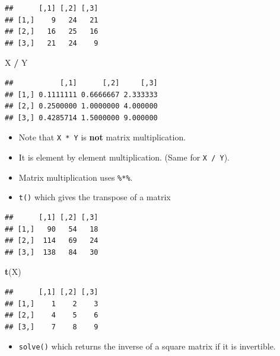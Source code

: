 \documentclass[]{book}
\newenvironment{Shaded}{\begin{snugshade}}{\end{snugshade}}
\newcommand{\KeywordTok}[1]{\textcolor[rgb]{0.13,0.29,0.53}{\textbf{#1}}}
\newcommand{\StringTok}[1]{\textcolor[rgb]{0.31,0.60,0.02}{#1}}
\newcommand{\OperatorTok}[1]{\textcolor[rgb]{0.81,0.36,0.00}{\textbf{#1}}}
\newcommand{\NormalTok}[1]{#1}
\providecommand{\tightlist}{%
  \setlength{\itemsep}{0pt}\setlength{\parskip}{0pt}}
\begin{document}
\begin{verbatim}
##      [,1] [,2] [,3]
## [1,]    9   24   21
## [2,]   16   25   16
## [3,]   21   24    9
\end{verbatim}

\begin{Shaded}
\begin{Highlighting}[]
\NormalTok{X }\OperatorTok{/}\StringTok{ }\NormalTok{Y}
\end{Highlighting}
\end{Shaded}

\begin{verbatim}
##           [,1]      [,2]     [,3]
## [1,] 0.1111111 0.6666667 2.333333
## [2,] 0.2500000 1.0000000 4.000000
## [3,] 0.4285714 1.5000000 9.000000
\end{verbatim}

\begin{itemize}
\item
  Note that \texttt{X\ *\ Y} is \textbf{not} matrix multiplication.
\item
  It is element by element multiplication. (Same for \texttt{X\ /\ Y}).
\item
  Matrix multiplication uses \texttt{\%*\%}.
\item
  \texttt{t()} which gives the transpose of a matrix
\end{itemize}

\begin{Shaded}
\end{Shaded}

\begin{verbatim}
##      [,1] [,2] [,3]
## [1,]   90   54   18
## [2,]  114   69   24
## [3,]  138   84   30
\end{verbatim}

\begin{Shaded}
\begin{Highlighting}[]
\KeywordTok{t}\NormalTok{(X)}
\end{Highlighting}
\end{Shaded}

\begin{verbatim}
##      [,1] [,2] [,3]
## [1,]    1    2    3
## [2,]    4    5    6
## [3,]    7    8    9
\end{verbatim}

\begin{itemize}
\tightlist
\item
  \texttt{solve()} which returns the inverse of a square matrix if it is
  invertible.
\end{itemize}
\end{document}
